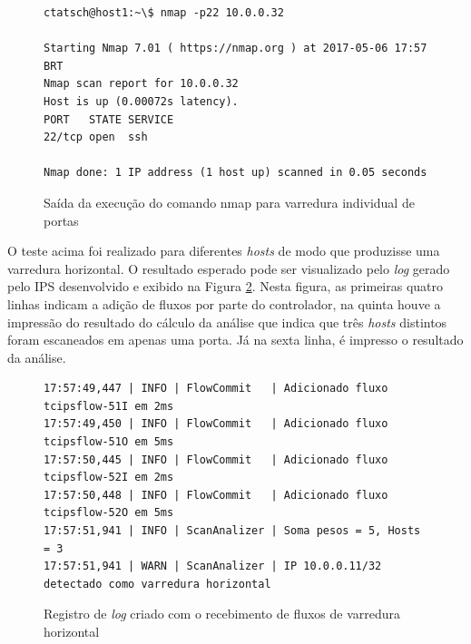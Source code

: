 \begin{figure}[H]
\centering
\caption{Saída da execução do comando nmap para varredura individual de portas}
\begin{lstlisting}[belowskip=-0.05\baselineskip]
ctatsch@host1:~\$ nmap -p22 10.0.0.32

Starting Nmap 7.01 ( https://nmap.org ) at 2017-05-06 17:57 BRT
Nmap scan report for 10.0.0.32
Host is up (0.00072s latency).
PORT   STATE SERVICE
22/tcp open  ssh

Nmap done: 1 IP address (1 host up) scanned in 0.05 seconds

\end{lstlisting}
\label{fig:outnmapp}
\end{figure}
\FloatBarrier
O teste acima foi realizado para diferentes \textit{hosts} de modo que produzisse uma varredura horizontal. O resultado esperado pode ser visualizado pelo \textit{log} gerado pelo IPS desenvolvido e exibido na Figura \ref{fig:loghor}. Nesta figura, as primeiras quatro linhas indicam a adição de fluxos por parte do controlador, na quinta houve a impressão do resultado do cálculo da análise que indica que três \textit{hosts} distintos foram escaneados em apenas uma porta. Já na sexta linha, é impresso o resultado da análise.

\begin{figure}[H]
\centering
\caption{Registro de \textit{log} criado com o recebimento de fluxos de varredura horizontal}
\begin{lstlisting}[belowskip=-0.05\baselineskip]
17:57:49,447 | INFO | FlowCommit   | Adicionado fluxo tcipsflow-51I em 2ms
17:57:49,450 | INFO | FlowCommit   | Adicionado fluxo tcipsflow-51O em 5ms
17:57:50,445 | INFO | FlowCommit   | Adicionado fluxo tcipsflow-52I em 2ms
17:57:50,448 | INFO | FlowCommit   | Adicionado fluxo tcipsflow-52O em 5ms
17:57:51,941 | INFO | ScanAnalizer | Soma pesos = 5, Hosts = 3
17:57:51,941 | WARN | ScanAnalizer | IP 10.0.0.11/32 detectado como varredura horizontal
\end{lstlisting}
\label{fig:loghor}
\end{figure}
\FloatBarrier


